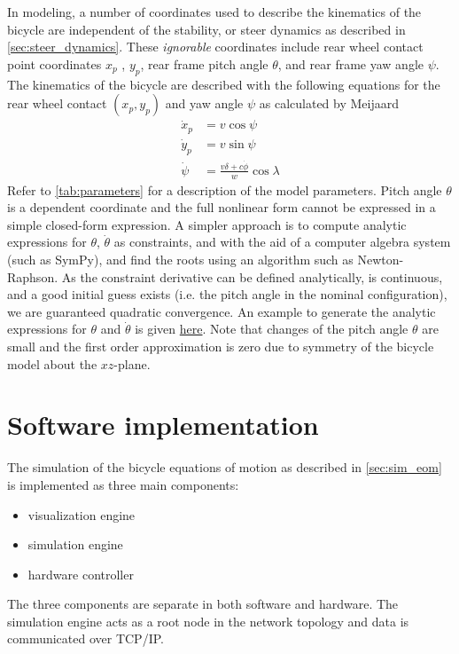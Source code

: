 \documentclass[11pt,a4paper,reqno]{amsart}
\newcommand{\x}{x_{p}}
\newcommand{\y}{y_{p}}
\newcommand{\pitch}{\theta}
\newcommand{\yaw}{\psi}
\newcommand{\steer}{\delta}
\newcommand{\dx}{\dot{x}_{p}}
\newcommand{\dy}{\dot{y}_{p}}
\newcommand{\pitchRate}{\dot{\theta}}
\newcommand{\yawRate}{\dot{\psi}}
\newcommand{\steerRate}{\dot{\phi}}
\begin{document}
In modeling, a number of coordinates used to describe the kinematics of the bicycle are independent of the stability, or
steer dynamics as described in \autoref{sec:steer_dynamics}.
These \textit{ignorable} coordinates include
rear wheel contact point coordinates $ x_p $ , $ y_p $,
rear frame pitch angle $ \pitch $, and rear frame yaw angle $ \yaw $.
The kinematics of the bicycle are described with the following equations for the rear wheel contact $ (\x, \y) $ and
yaw angle $ \yaw $ as calculated by Meijaard\cite{meijaard2007}
\begin{equation}
\begin{aligned}
    \dx &= v \cos{\yaw} \\
    \dy &= v \sin{\yaw} \\
    \yawRate &= \frac{v \steer + c \steerRate}{w} \cos{\lambda} \label{eq:kineq}
\end{aligned}
\end{equation}
Refer to \autoref{tab:parameters} for a description of the model parameters.
Pitch angle $ \pitch $ is a dependent coordinate and the full nonlinear form cannot be expressed in a simple closed-form
expression.
A simpler approach is to compute analytic expressions for $ \pitch $, $ \pitchRate $ as constraints, and with the aid of
a computer algebra system (such as SymPy\cite{sympy}), and find the roots using an algorithm such as Newton-Raphson.
As the constraint derivative can be defined analytically, is continuous, and a good initial guess exists (i.e. the pitch
angle in the nominal configuration), we are guaranteed quadratic convergence.
An example to generate the analytic expressions for $ \pitch$ and $ \pitchRate $ is given
\href{https://github.com/oliverlee/bicycle/blob/master/python/pitch_constraint.py}{here}.
Note that changes of the pitch angle $ \pitch $ are small and the first order approximation is zero due to symmetry of
the bicycle model about the $ xz $-plane.

\section{Software implementation}
The simulation of the bicycle equations of motion as described in \autoref{sec:sim_eom} is implemented as three main
components:
\begin{itemize}
    \item visualization engine
    \item simulation engine
    \item hardware controller
\end{itemize}
The three components are separate in both software and hardware.
The simulation engine acts as a root node in the network topology and data is communicated over TCP/IP.
\end{document}
